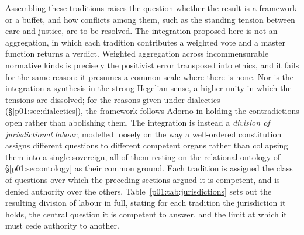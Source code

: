 Assembling these traditions raises the question whether the result is a framework or a buffet, and how conflicts among them, such as the standing tension between care and justice, are to be resolved. The integration proposed here is not an aggregation, in which each tradition contributes a weighted vote and a master function returns a verdict. Weighted aggregation across incommensurable normative kinds is precisely the positivist error transposed into ethics, and it fails for the same reason: it presumes a common scale where there is none. Nor is the integration a synthesis in the strong Hegelian sense, a higher unity in which the tensions are dissolved; for the reasons given under dialectics (§\ref{p01:sec:dialectics}), the framework follows Adorno in holding the contradictions open rather than abolishing them. The integration is instead a \emph{division of jurisdictional labour}, modelled loosely on the way a well-ordered constitution assigns different questions to different competent organs rather than collapsing them into a single sovereign, all of them resting on the relational ontology of §\ref{p01:sec:ontology} as their common ground. Each tradition is assigned the class of questions over which the preceding sections argued it is competent, and is denied authority over the others. Table~\ref{p01:tab:jurisdictions} sets out the resulting division of labour in full, stating for each tradition the jurisdiction it holds, the central question it is competent to answer, and the limit at which it must cede authority to another.

